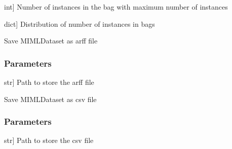 \documentclass[letterpaper,10pt,english]{sphinxmanual}
\begin{document}
\begin{fulllineitems}
\begin{fulllineitems}
\begin{description}
\sphinxlineitem{max\_instances}{[}int{]}
\sphinxAtStartPar
Number of instances in the bag with maximum number of instances

\sphinxlineitem{distribution}{[}dict{]}
\sphinxAtStartPar
Distribution of number of instances in bags

\end{description}

\end{fulllineitems}


\begin{fulllineitems}
\label{\detokenize{data/_autosummary/miml.data.miml_dataset.MIMLDataset:miml.data.miml_dataset.MIMLDataset.save_arff}}
\pysigstartsignatures
{}
\pysigstopsignatures
\sphinxAtStartPar
Save MIMLDataset as arff file


\subsubsection{Parameters}
\label{\detokenize{data/_autosummary/miml.data.miml_dataset.MIMLDataset:id29}}\begin{description}
\sphinxlineitem{path}{[}str{]}
\sphinxAtStartPar
Path to store the arff file

\end{description}

\end{fulllineitems}


\begin{fulllineitems}
\label{\detokenize{data/_autosummary/miml.data.miml_dataset.MIMLDataset:miml.data.miml_dataset.MIMLDataset.save_csv}}
\pysigstartsignatures
{}
\pysigstopsignatures
\sphinxAtStartPar
Save MIMLDataset as csv file


\subsubsection{Parameters}
\label{\detokenize{data/_autosummary/miml.data.miml_dataset.MIMLDataset:id30}}\begin{description}
\sphinxlineitem{path}{[}str{]}
\sphinxAtStartPar
Path to store the csv file


\end{description}
\end{fulllineitems}
\end{fulllineitems}
\end{document}

